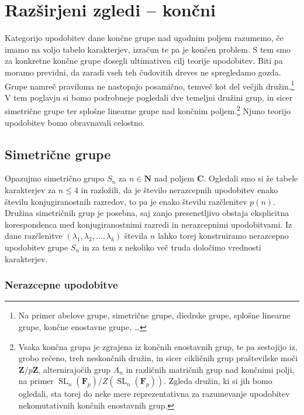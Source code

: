 \documentclass[11pt]{book}
\def\NN{\mathbf{N}}
\def\ZZ{\mathbf{Z}}
\def\CC{\mathbf{C}}
\def\FF{\mathbf{F}}
\DeclareMathOperator\SL{SL}
\theoremstyle{definition}
\theoremstyle{zgled}
\theoremstyle{odprtproblem}
\theoremstyle{domacanaloga}
\theoremstyle{izrek}
\begin{document}
\chapter{Razširjeni zgledi -- končni}

Kategorijo upodobitev dane končne grupe nad ugodnim poljem razumemo, če imamo na voljo tabelo karakterjev, izračun te pa je končen problem. S tem smo za konkretne končne grupe dosegli ultimativen cilj teorije upodobitev. Biti pa moramo previdni, da zaradi vseh teh čudovitih dreves ne spregledamo gozda. Grupe namreč praviloma ne nastopajo posamično, temveč kot del večjih družin.\footnote{Na primer abelove grupe, simetrične grupe, diedrske grupe, splošne linearne grupe, končne enostavne grupe, \dots} V tem poglavju si bomo podrobneje pogledali dve temeljni družini grup, in sicer simetrične grupe ter splošne linearne grupe nad končnim poljem.\footnote{Vsaka končna grupa je zgrajena iz končnih enostavnih grup, te pa sestojijo iz, grobo rečeno, treh neskončnih družin, in sicer cikličnih grup praštevilske moči $\ZZ/p\ZZ$, alternirajočih grup $A_n$ in različnih matričnih grup nad končnimi polji, na primer $\SL_n(\FF_p)/Z(\SL_n(\FF_p))$. Zgleda družin, ki si jih bomo ogledali, sta torej do neke mere reprezentativna za razumevanje upodobitev nekomutativnih končnih enostavnih grup.} Njuno teorijo upodobitev bomo obravnavali celostno.

\section{Simetrične grupe}

Opazujmo simetrično grupo $S_n$ za $n \in \NN$ nad poljem $\CC$. Ogledali smo si že tabele karakterjev za $n \leq 4$ in razložili, da je število nerazcepnih upodobitev enako številu konjugiranostnih razredov, to pa je enako številu razčlenitev $p(n)$. Družina simetričnih grup je posebna, saj zanjo presenetljivo obstaja eksplicitna korespondenca med konjugiranostnimi razredi in nerazcepnimi upodobitvami. Iz dane razčlenitve $(\lambda_1, \lambda_2, \dots, \lambda_k)$ števila $n$ lahko torej konstruiramo nerazcepno upodobitev grupe $S_n$ in za tem z nekoliko več truda določimo vrednosti karakterjev.

\subsection{Nerazcepne upodobitve}
\end{document}
